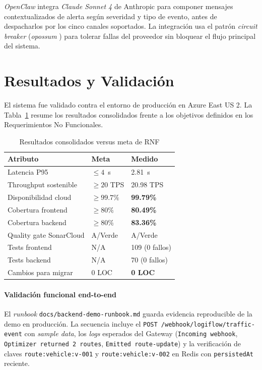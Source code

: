 \documentclass[conference]{IEEEtran}
\begin{document}
\emph{OpenClaw} integra \emph{Claude Sonnet 4} de Anthropic \cite{anthropic-claude} para componer mensajes contextualizados de alerta seg\'un severidad y tipo de evento, antes de despacharlos por los cinco canales soportados. La integraci\'on usa el patr\'on \emph{circuit breaker} (\emph{opossum} \cite{opossum}) para tolerar fallas del proveedor sin bloquear el flujo principal del sistema.

\section{Resultados y Validaci\'on}
\label{sec:resultados}

El sistema fue validado contra el entorno de producci\'on en Azure East US 2. La Tabla~\ref{tab:resultados} resume los resultados consolidados frente a los objetivos definidos en los Requerimientos No Funcionales.

\begin{table}[ht]
\caption{Resultados consolidados versus meta de RNF}
\label{tab:resultados}
\centering
\renewcommand{\arraystretch}{1.2}
\begin{tabularx}{\columnwidth}{lXl}
\toprule
\textbf{Atributo} & \textbf{Meta} & \textbf{Medido} \\
\midrule
Latencia P95 & $\leq 4$~s & 2.81~s \\
Throughput sostenible & $\geq 20$ TPS & 20.98 TPS \\
Disponibilidad cloud & $\geq 99.7\%$ & \textbf{99.79\%} \\
Cobertura frontend & $\geq 80\%$ & \textbf{80.49\%} \\
Cobertura backend & $\geq 80\%$ & \textbf{83.36\%} \\
Quality gate SonarCloud & A/Verde & A/Verde \\
Tests frontend & N/A & 109 (0 fallos) \\
Tests backend & N/A & 70 (0 fallos) \\
Cambios para migrar & 0 LOC & \textbf{0 LOC} \\
\bottomrule
\end{tabularx}
\end{table}

\paragraph{Validaci\'on funcional end-to-end} El \emph{runbook} \texttt{docs/backend-demo-runbook.md} guarda evidencia reproducible de la demo en producci\'on. La secuencia incluye el \texttt{POST /webhook/logiflow/traffic-event} con \emph{sample data}, los \emph{logs} esperados del Gateway (\texttt{Incoming webhook}, \texttt{Optimizer returned 2 routes}, \texttt{Emitted route-update}) y la verificaci\'on de claves \texttt{route:vehicle:v-001} y \texttt{route:vehicle:v-002} en Redis con \texttt{persistedAt} reciente.
\end{document}
